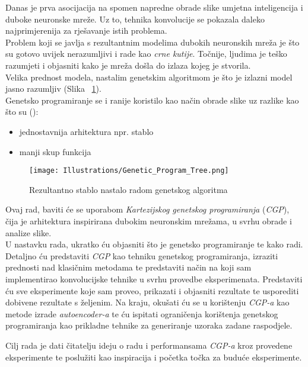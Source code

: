 Danas je prva asocijacija na spomen napredne obrade slike umjetna inteligencija i duboke neuronske mreže.
Uz to, tehnika konvolucije se pokazala daleko najprimjerenija za rješavanje istih problema. \\
Problem koji se javlja s rezultantnim modelima dubokih neuronskih mreža je što su gotovo uvijek nerazumljivi i rade kao \emph{crne kutije}.
Točnije, ljudima je teško razumjeti i objasniti kako je mreža došla do izlaza kojeg je stvorila. \\
Velika prednost modela, nastalim genetskim algoritmom je što je izlazni model jasno razumljiv (Slika ~\ref{fig:gen_alg_tree_1}). \\
Genetsko programiranje se i ranije koristilo kao način obrade slike uz razlike kao što su (\cite{cgp_image_processing}):
\begin{itemize}
	\item jednostavnija arhitektura npr. stablo
	\item manji skup funkcija
\end{itemize}

\begin{figure}
	\centering
	\texttt{[image: Illustrations/Genetic\_Program\_Tree.png]}
	\caption{Rezultantno stablo nastalo radom genetskog algoritma}
	\label{fig:gen_alg_tree_1}
\end{figure}

Ovaj rad, baviti će se uporabom \emph{Kartezijskog genetskog programiranja} (\emph{CGP}), čija je arhitektura inspirirana dubokim neuronskim mrežama, u svrhu obrade i analize slike. \\
U nastavku rada, ukratko ću objasniti što je genetsko programiranje te kako radi.
Detaljno ću predstaviti \emph{CGP} kao tehniku genetskog programiranja, izraziti prednosti nad klasičnim metodama te predstaviti način na koji sam implementirao konvolucijske tehnike u svrhu provedbe eksperimenata.
Predstaviti ću sve eksperimente koje sam proveo, prikazati i objasniti rezultate te usporediti dobivene rezultate s željenim.
Na kraju, okušati ću se u korištenju \emph{CGP-a} kao metode izrade \emph{autoencoder-a} te ću ispitati ograničenja korištenja genetskog programiranja kao prikladne tehnike za generiranje uzoraka zadane raspodjele.

Cilj rada je dati čitatelju ideju o radu i performansama \emph{CGP-a} kroz provedene eksperimente te poslužiti kao inspiracija i početka točka za buduće eksperimente.
